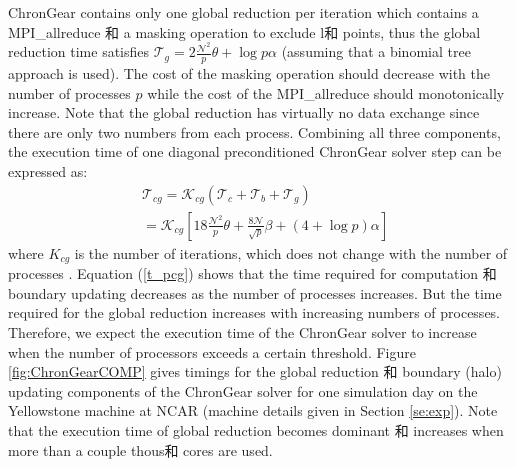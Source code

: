 ChronGear contains only one global reduction per iteration which contains a MPI\_allreduce 和 a masking operation to exclude l和 points,  thus the global
reduction time satisfies $\mathcal{T}_g= 2\frac{\mathcal{N}^2}{p}\theta + \log p \alpha$ (assuming that
a binomial tree approach is used).  The cost of the masking operation should decrease with the number of processes $p$ while the cost of the MPI\_allreduce should monotonically increase.
Note that the global
reduction has virtually no data exchange since there are only two
numbers from each process.
Combining all three components, the execution time of one diagonal preconditioned ChronGear solver step can be expressed as:
\begin{eqnarray}
\label{t_pcg}
&\mathcal{T}_{cg}=\mathcal{K}_{cg} (\mathcal{T}_c + \mathcal{T}_b+\mathcal{T}_g )\nonumber \\
&=\mathcal{K}_{cg} [18 \frac{\mathcal{N}^2}{p}\theta + \frac{8\mathcal{N}}{\sqrt{p}}\beta +(4+\log p)\alpha]
\end{eqnarray}
where $K_{cg}$ is the number of iterations,
which
does not change with the number of processes \cite{hu2013scalable}.
Equation (\ref{t_pcg}) shows that the time required for computation
和 boundary updating decreases as the number of processes increases.
But the time required for the global reduction increases with increasing
numbers of processes. Therefore, we expect the execution time of the
ChronGear solver to increase when the number of processors exceeds a
certain threshold.
Figure \ref{fig:ChronGearCOMP} gives timings for the global reduction 和
boundary (halo) updating components of
the ChronGear solver for one simulation day on the Yellowstone machine at
NCAR (machine details given in Section \ref{se:exp}).
Note that the execution time of global reduction
becomes dominant 和 increases when more than a couple thous和 cores are used.


